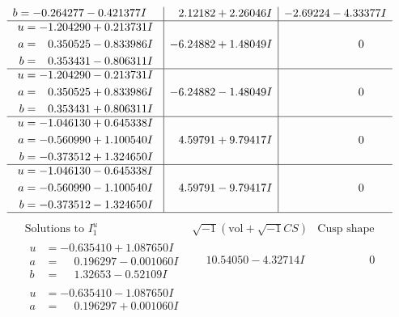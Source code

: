 \documentclass[1p]{elsarticle_modified}
\theoremstyle{definition}
\newcommand{\I}{\sqrt{-1}}
\begin{document}
$$\begin{array}{c|c|c}
\begin{aligned}
b &= -0.264277 - 0.421377 I\end{aligned}
 & \phantom{-}2.12182 + 2.26046 I & -2.69224 - 4.33377 I \\ \hline\begin{aligned}
u &= -1.204290 + 0.213731 I \\
a &= \phantom{-}0.350525 - 0.833986 I \\
b &= \phantom{-}0.353431 - 0.806311 I\end{aligned}
 & -6.24882 + 1.48049 I & \phantom{-0.000000 } 0 \\ \hline\begin{aligned}
u &= -1.204290 - 0.213731 I \\
a &= \phantom{-}0.350525 + 0.833986 I \\
b &= \phantom{-}0.353431 + 0.806311 I\end{aligned}
 & -6.24882 - 1.48049 I & \phantom{-0.000000 } 0 \\ \hline\begin{aligned}
u &= -1.046130 + 0.645338 I \\
a &= -0.560990 + 1.100540 I \\
b &= -0.373512 + 1.324650 I\end{aligned}
 & \phantom{-}4.59791 + 9.79417 I & \phantom{-0.000000 } 0 \\ \hline\begin{aligned}
u &= -1.046130 - 0.645338 I \\
a &= -0.560990 - 1.100540 I \\
b &= -0.373512 - 1.324650 I\end{aligned}
 & \phantom{-}4.59791 - 9.79417 I & \phantom{-0.000000 } 0\\
 \hline 
 \end{array}$$\newpage$$\begin{array}{c|c|c}  
\text{Solutions to }I^u_{1}& \I (\text{vol} + \sqrt{-1}CS) & \text{Cusp shape}\\
 \hline 
\begin{aligned}
u &= -0.635410 + 1.087650 I \\
a &= \phantom{-}0.196297 - 0.001060 I \\
b &= \phantom{-}1.32653 - 0.52109 I\end{aligned}
 & \phantom{-}10.54050 - 4.32714 I & \phantom{-0.000000 } 0 \\ \hline\begin{aligned}
u &= -0.635410 - 1.087650 I \\
a &= \phantom{-}0.196297 + 0.001060 I \\

\end{aligned}
\end{array}$$
\end{document}
